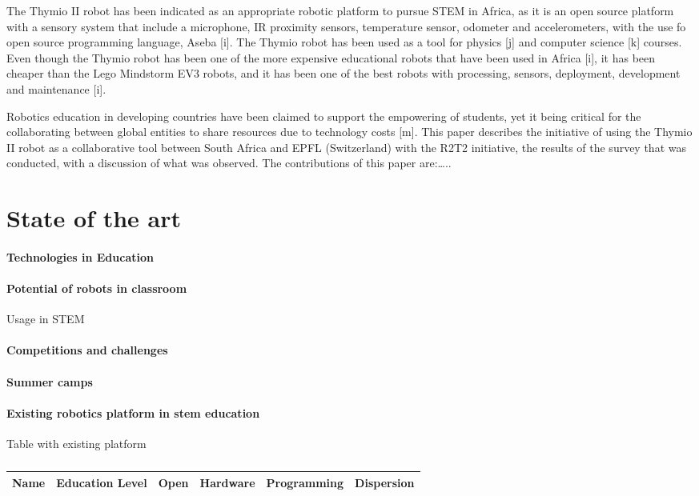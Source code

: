 \documentclass{intech-journal}
\begin{document}
The Thymio II robot has been indicated as an appropriate robotic platform to pursue STEM in Africa, as it is an open source platform with a sensory system that include a microphone, IR proximity sensors, temperature sensor, odometer and accelerometers, with the use fo open source programming language, Aseba [i]. The Thymio robot has been used as a tool for physics [j] and computer science [k] courses. Even though the Thymio robot has been one of the more expensive educational robots that have been used in Africa [i], it has been cheaper than the Lego Mindstorm EV3 robots, and it has been one of the best robots with processing, sensors, deployment, development and maintenance [i].
 
Robotics education in developing countries have been claimed to support the empowering of students, yet it being critical for the collaborating between global entities to share resources due to technology costs [m]. This paper describes the initiative of using the Thymio II robot as a collaborative tool between South Africa and EPFL (Switzerland) with the R2T2 initiative, the results of the survey that was conducted, with a discussion of what was observed.
The contributions of this paper are:…..

\section{State of the art}
\paragraph{Technologies in Education \cite{winthrop2012new}}

\paragraph{Potential of robots in classroom}
Usage in STEM

\paragraph{Competitions and challenges}

\paragraph{Summer camps}

\paragraph{Existing robotics platform in stem education \cite{Karim2015}}
Table with existing platform
\begin{table*}[h]
\begin{tabular}{|c|c|c|c|c|c|} \hline
Name & Education Level & Open & Hardware & Programming & Dispersion \\ \hline

\end{tabular}
\caption{}
\end{table*}
\end{document}
